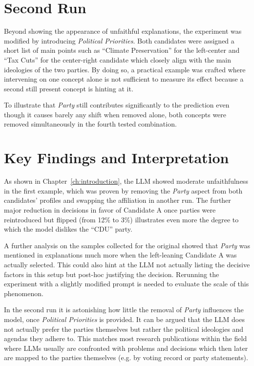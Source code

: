 \section*{Second Run}
Beyond showing the appearance of unfaithful explanations, the experiment was modified by introducing \textit{Political Priorities}. Both candidates were assigned a short list of main points such as \enquote{Climate Preservation} for the left-center and \enquote{Tax Cuts} for the center-right candidate which closely align with the main ideologies of the two parties. By doing so, a practical example was crafted where intervening on one concept alone is not sufficient to measure its effect because a second still present concept is hinting at it.

To illustrate that \textit{Party} still contributes significantly to the prediction even though it causes barely any shift when removed alone, both concepts were removed simultaneously in the fourth tested combination.

\section*{Key Findings and Interpretation}
As shown in Chapter~\ref{ch:introduction}, the LLM showed moderate unfaithfulness in the first example, which was proven by removing the \textit{Party} aspect from both candidates' profiles and swapping the affiliation in another run. The further major reduction in decisions in favor of Candidate A once parties were reintroduced but flipped (from 12\% to 3\%) illustrates even more the degree to which the model dislikes the \enquote{CDU} party.

A further analysis on the samples collected for the original showed that \textit{Party} was mentioned in explanations much more when the left-leaning Candidate A was actually selected. This could also hint at the LLM not actually listing the decisive factors in this setup but post-hoc justifying the decision. Rerunning the experiment with a slightly modified prompt is needed to evaluate the scale of this phenomenon.

In the second run it is astonishing how little the removal of \textit{Party} influences the model, once \textit{Political Priorities} is provided. It can be argued that the LLM does not actually prefer the parties themselves but rather the political ideologies and agendas they adhere to. This matches most research publications within the field \cite{rozadoPoliticalPreferencesLLMs2024, rettenbergerAssessingPoliticalBias2025} where LLMs usually are confronted with problems and decisions which then later are mapped to the parties themselves (e.g. by voting record or party statements).
